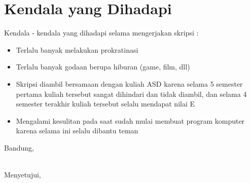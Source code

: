 \documentclass[a4paper,twoside]{article}
\begin{document}
\section{Kendala yang Dihadapi}
Kendala - kendala yang dihadapi selama mengerjakan skripsi :
\begin{itemize}
	\item Terlalu banyak melakukan prokratinasi
	\item Terlalu banyak godaan berupa hiburan (game, film, dll)
	\item Skripsi diambil bersamaan dengan kuliah ASD karena selama 5 semester pertama kuliah tersebut sangat dihindari dan tidak diambil, dan selama 4 semester terakhir kuliah tersebut selalu mendapat nilai E
	\item Mengalami kesulitan pada saat sudah mulai membuat program komputer karena selama ini selalu dibantu teman
\end{itemize}

\vspace{1cm}
\centering Bandung, \tanggal\\
\vspace{2cm} \nama \\ 
\vspace{1cm}

Menyetujui, \\
\end{document}
